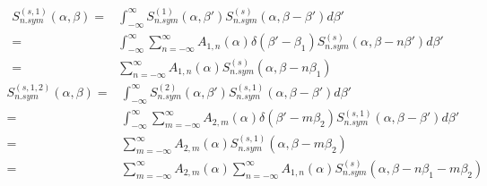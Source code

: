 \documentclass[../master.tex]{subfiles}
\begin{document}
                                \begin{align}
                                  S^{(s,1)}_{n.sym}(\alpha,\beta)=&\int_{-\infty}^{\infty}S^{(1)}_{n.sym}\left(\alpha,\beta'\right)S^{(s)}_{n.sym}\left(\alpha,\beta-\beta'\right)d\beta'\\
                                  =&\int_{-\infty}^{\infty}\sum_{n=-\infty}^{\infty}A_{1,n}(\alpha)\delta\left(\beta'-\beta_1\right)S^{(s)}_{n.sym}\left(\alpha,\beta-n\beta'\right)d\beta'\\
                                  =&\sum_{n=-\infty}^{\infty}A_{1,n}(\alpha)S^{(s)}_{n.sym}\left(\alpha,\beta-n\beta_1\right)
                                \end{align}
                                \begin{align}
                                  S^{(s,1,2)}_{n.sym}(\alpha,\beta)=&\int_{-\infty}^{\infty}S^{(2)}_{n.sym}\left(\alpha,\beta'\right)S^{(s,1)}_{n.sym}\left(\alpha,\beta-\beta'\right)d\beta'\\
                                  =&\int_{-\infty}^{\infty}\sum_{m=-\infty}^{\infty}A_{2,m}(\alpha)\delta\left(\beta'-m\beta_2\right)S^{(s,1)}_{n.sym}\left(\alpha,\beta-\beta'\right)d\beta'\\
                                  =&\sum_{m=-\infty}^{\infty}A_{2,m}(\alpha)S^{(s,1)}_{n.sym}\left(\alpha,\beta-m\beta_2\right)\\
                                  =&\sum_{m=-\infty}^{\infty}A_{2,m}(\alpha)\sum_{n=-\infty}^{\infty}A_{1,n}(\alpha)S^{(s)}_{n.sym}\left(\alpha,\beta-n\beta_1-m\beta_2\right)
                                \label{eq:finalDelta}\end{align}





			
\end{document}
